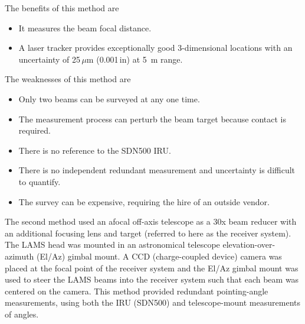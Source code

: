 \documentclass[12pt,twoside,english]{article}\usepackage[]{graphicx}\usepackage[]{color}
\begin{document}
{{The benefits of this method are  
\begin{itemize}
\item It measures the beam focal distance. 
\item A laser tracker provides exceptionally good 3-dimensional locations with an uncertainty of 25\,$\mu$m (0.001\,in) at 5~m range.

\end{itemize}

The weaknesses of this method are  
\begin{itemize}
\item Only two beams can be surveyed at any one time. 

\item The measurement process can perturb the beam target because
contact is required. 

\item There is no reference to the SDN500 IRU. 

\item There is no independent redundant measurement and uncertainty is difficult to quantify. 

\item The survey can be expensive, requiring the hire of an outside vendor.  
\end{itemize}







The second method used an afocal off-axis telescope as a 30x beam reducer with
an additional focusing lens and target (referred to here as the receiver
system). The LAMS head was mounted in an astronomical telescope
elevation-over-azimuth (El/Az) gimbal mount. A CCD (charge-coupled device) camera was placed at the focal 
point of the receiver system and the El/Az gimbal mount was used to steer
the LAMS beams into the receiver system such that each beam was centered on
the camera. This method provided redundant pointing-angle measurements, using
both the IRU (SDN500) and telescope-mount measurements of angles.

}}
\end{document}

